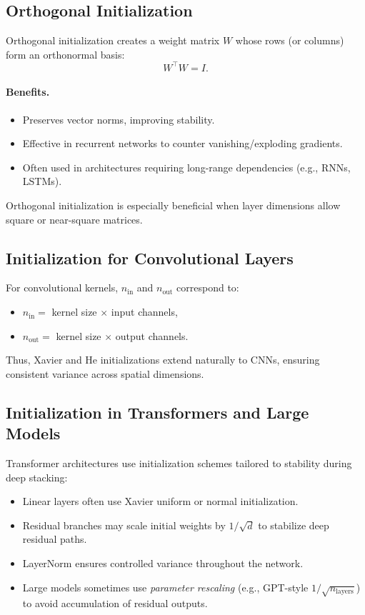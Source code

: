 \documentclass[12pt,a4paper]{report}
\begin{document}
\subsection{Orthogonal Initialization}

Orthogonal initialization creates a weight matrix $W$ whose rows (or columns) form an orthonormal basis:
\[
W^\top W = I.
\]

\paragraph{Benefits.}
\begin{itemize}
    \item Preserves vector norms, improving stability.
    \item Effective in recurrent networks to counter vanishing/exploding gradients.
    \item Often used in architectures requiring long-range dependencies (e.g., RNNs, LSTMs).
\end{itemize}

Orthogonal initialization is especially beneficial when layer dimensions allow square or near-square matrices.

\vspace{1em}
\subsection{Initialization for Convolutional Layers}

For convolutional kernels, $n_{\text{in}}$ and $n_{\text{out}}$ correspond to:
\begin{itemize}
    \item $n_{\text{in}} =$ kernel size $\times$ input channels,
    \item $n_{\text{out}} =$ kernel size $\times$ output channels.
\end{itemize}

Thus, Xavier and He initializations extend naturally to CNNs, ensuring consistent variance across spatial dimensions.

\vspace{1em}
\subsection{Initialization in Transformers and Large Models}

Transformer architectures use initialization schemes tailored to stability during deep stacking:
\begin{itemize}
    \item Linear layers often use Xavier uniform or normal initialization.
    \item Residual branches may scale initial weights by $1/\sqrt{d}$ to stabilize deep residual paths.
    \item LayerNorm ensures controlled variance throughout the network.
    \item Large models sometimes use \textit{parameter rescaling} (e.g., GPT-style $1/\sqrt{n_{\text{layers}}}$) to avoid accumulation of residual outputs.
\end{itemize}
\end{document}
